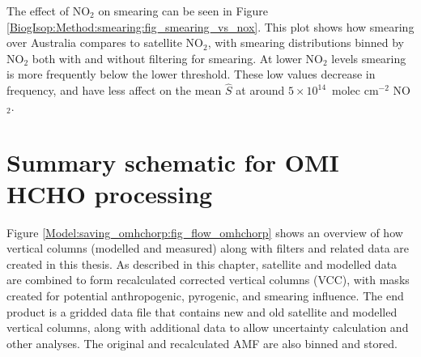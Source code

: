 {      %
      The effect of NO$_2$ on smearing can be seen in Figure \ref{BiogIsop:Method:smearing:fig_smearing_vs_nox}.
      This plot shows how smearing over Australia compares to satellite NO$_2$, with smearing distributions binned by NO$_2$ both with and without filtering for smearing.
      At lower NO$_2$ levels smearing is more frequently below the lower threshold. 
      These low values decrease in frequency, and have less affect on the mean $\hat{S}$ at around $5 \times 10^{14} $~molec cm$^{-2}$ NO$_2$.
      
    
\section{Summary schematic for OMI HCHO processing}
  \label{Model:saving_omhchorp}
  Figure \ref{Model:saving_omhchorp:fig_flow_omhchorp} shows an overview of how vertical columns (modelled and measured) along with filters and related data are created in this thesis.
  As described in this chapter, satellite and modelled data are combined to form recalculated corrected vertical columns (VCC), with masks created for potential anthropogenic, pyrogenic, and smearing influence.
  The end product is a gridded data file that contains new and old satellite and modelled vertical columns, along with additional data to allow uncertainty calculation and other analyses.
  The original and recalculated AMF are also binned and stored.
  
}
